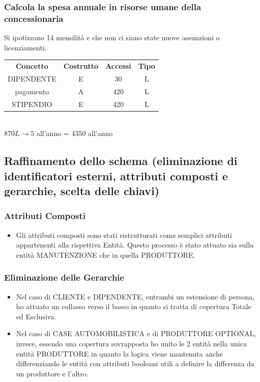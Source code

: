 \documentclass[12pt]{article}
\begin{document}
\subsubsection{Calcola la spesa annuale in risorse umane della concessionaria}

Si ipotizzano 14 mensilità e che non ci siano state nuove assunzioni o licenziamenti.

\begin{table}[H]
    \centering
    \begin{tabular}{c c c c}
        \rowcolor{red!20!}
        \textbf{Concetto} & \textbf{Costrutto} & \textbf{Accessi} &
        \textbf{Tipo}\\
        DIPENDENTE & E & 30 & L \\
        pagamento & A & 420 & L \\
        STIPENDIO & E & 420 & L \\
    \end{tabular}\\
    \( 870L \rightarrow 5 \) all'anno = \( 4350 \) all'anno
\end{table}

\subsection{Raffinamento dello schema (eliminazione di identificatori esterni,
attributi composti e gerarchie, scelta delle chiavi)}

\subsubsection{Attributi Composti}
\begin{itemize}
    \item Gli attributi composti sono stati ristrutturati come semplici
    attributi appartenenti alla rispettiva Entità. Questo processo è stato
    attuato sia sulla entità MANUTENZIONE che in quella PRODUTTORE.
\end{itemize}

\subsubsection{Eliminazione delle Gerarchie}

\begin{itemize}
    \item Nel caso di CLIENTE e DIPENDENTE, entrambi un estensione di persona,
    ho attuato un collasso verso il basso in quanto si tratta di copertura
    Totale ed Esclusiva.
    \item Nel caso di CASE AUTOMOBILISTICA e di PRODUTTORE OPTIONAL, invece,
    essendo una copertura sovrapposta ho unito le 2 entità nella unica entità
    PRODUTTORE in quanto la logica viene mantenuta anche differenziando le
    entità con attributi booleani utili a definire la differenza da un produttore e
    l'altro.
\end{itemize}
\end{document}
